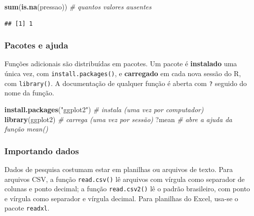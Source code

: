 \documentclass[
]{book}
\newenvironment{Shaded}{\begin{snugshade}}{\end{snugshade}}
\newcommand{\CommentTok}[1]{\textcolor[rgb]{0.56,0.35,0.01}{\textit{#1}}}
\newcommand{\FunctionTok}[1]{\textcolor[rgb]{0.13,0.29,0.53}{\textbf{#1}}}
\newcommand{\NormalTok}[1]{#1}
\newcommand{\StringTok}[1]{\textcolor[rgb]{0.31,0.60,0.02}{#1}}
\begin{document}
\begin{Shaded}
\begin{Highlighting}[]
\FunctionTok{sum}\NormalTok{(}\FunctionTok{is.na}\NormalTok{(pressao))      }\CommentTok{\# quantos valores ausentes}
\end{Highlighting}
\end{Shaded}

\begin{verbatim}
## [1] 1
\end{verbatim}

\subsubsection{Pacotes e ajuda}\label{pacotes-e-ajuda}

Funções adicionais são distribuídas em pacotes. Um pacote é \textbf{instalado} uma única vez, com \texttt{install.packages()}, e \textbf{carregado} em cada nova sessão do R, com \texttt{library()}. A documentação de qualquer função é aberta com \texttt{?} seguido do nome da função.

\begin{Shaded}
\begin{Highlighting}[]
\FunctionTok{install.packages}\NormalTok{(}\StringTok{"ggplot2"}\NormalTok{)   }\CommentTok{\# instala (uma vez por computador)}
\FunctionTok{library}\NormalTok{(ggplot2)              }\CommentTok{\# carrega (uma vez por sessão)}
\NormalTok{?mean                         }\CommentTok{\# abre a ajuda da função mean()}
\end{Highlighting}
\end{Shaded}

\subsubsection{Importando dados}\label{importando-dados}

Dados de pesquisa costumam estar em planilhas ou arquivos de texto. Para arquivos CSV, a função \texttt{read.csv()} lê arquivos com vírgula como separador de colunas e ponto decimal; a função \texttt{read.csv2()} lê o padrão brasileiro, com ponto e vírgula como separador e vírgula decimal. Para planilhas do Excel, usa-se o pacote \texttt{readxl}.
\end{document}
